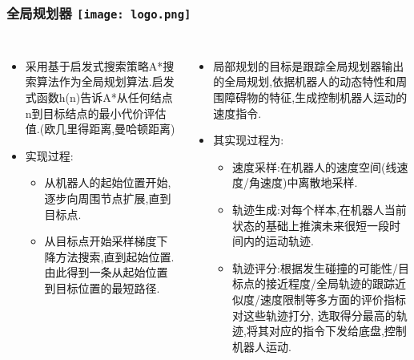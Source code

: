 \begin{comment}
\end{comment}
\begin{frame}
\frametitle{全局规划器 \hfill \texttt{[image: logo.png]}}
\begin{columns}
	\begin{itemize}
		\item 采用基于启发式搜索策略A*搜索算法作为全局规划算法.启发式函数h(n)告诉A*从任何结点n到目标结点的最小代价评估值.(欧几里得距离,曼哈顿距离)
		\vspace{0.2cm}
		\item 实现过程:
		\begin{itemize}
			\item 从机器人的起始位置开始,逐步向周围节点扩展,直到目标点.
			\item 从目标点开始采样梯度下降方法搜索,直到起始位置.由此得到一条从起始位置到目标位置的最短路径.
		\end{itemize}	
	\epsilon
		\end{itemize}
	\begin{itemize}
		\item 局部规划的目标是跟踪全局规划器输出的全局规划,依据机器人的动态特性和周围障碍物的特征,生成控制机器人运动的速度指令.
		\vspace{0.5cm}
		\item 其实现过程为:
		\begin{itemize}
			\item 速度采样:在机器人的速度空间(线速度/角速度)中离散地采样.
			\item 轨迹生成:对每个样本,在机器人当前状态的基础上推演未来很短一段时间内的运动轨迹. 
			\item 轨迹评分:根据发生碰撞的可能性/目标点的接近程度/全局轨迹的跟踪近似度/速度限制等多方面的评价指标对这些轨迹打分,
			选取得分最高的轨迹,将其对应的指令下发给底盘,控制机器人运动.
		\end{itemize}
	\end{itemize}
\end{columns}
\end{frame}





